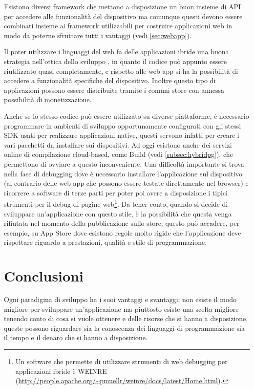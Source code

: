         Esistono diversi frame\-work che mettono a disposizione un buon insieme di
        API per accedere alle funzionalità del dispositivo ma comunque questi
        devono essere combinati insieme ai frame\-work utilizzabili
        per costruire applicazioni web in modo da poterne sfruttare tutti i
        vantaggi (vedi \ref{sec:webapp}).

        Il poter utilizzare i linguaggi del web fa delle applicazioni ibride una
        buona strategia nell'ottica dello sviluppo \crossplat{}, in quanto
        il codice può appunto essere riutilizzato quasi completamente, e
        rispetto alle web app si ha la possibilità di accedere a
        funzionalità specifiche del dispositivo. Inoltre questo tipo di
        applicazioni possono essere distribuite tramite i comuni \mbox{store} con
        annessa possibilità di monetizzazione.

        Anche se lo stesso codice può essere utilizzato su diverse piattaforme,
        è necessario programmare in ambienti di sviluppo opportunamente
        configurati con gli stessi SDK usati per realizzare applicazioni native,
        questi servono infatti per creare i vari pacchetti da installare sui
        dispositivi. Ad oggi
        esistono anche dei servizi online di compilazione cloud-based, come
        \pg{} Build (vedi \ref{subsec:hybridpg}), che permettono di ovviare a
        questo inconveniente. Una difficoltà
        importante si trova nella fase di debugging dove è necessario installare
        l'applicazione sul dispositivo (al contrario delle web app che possono
        essere testate direttamente nel \mbox{browser}) e ricorrere a software di terze
        parti per poter poi avere a disposizione i tipici strumenti per il
        debug di pagine web\footnote{Un software che permette di utilizzare
        strumenti di web debugging per applicazioni ibride è WEINRE
        (\url{http://people.apache.org/~pmuellr/weinre/docs/latest/Home.html}).
        }. Da tener conto, quando si decide di sviluppare un'applicazione con
        questo stile, è la possibilità che questa venga rifiutata nel momento
        della pubblicazione sullo \mbox{store}; questo può accadere, per esempio, su
        App Store dove esistono regole molto rigide che l'applicazione deve
        rispettare riguardo a prestazioni, qualità e stile di programmazione.

    \section{Conclusioni}
        Ogni paradigma di sviluppo ha i suoi vantaggi e svantaggi; non esiste il
        modo migliore per sviluppare un'applicazione ma piuttosto esiste una
        scelta migliore tenendo conto di cosa si vuole ottenere e delle risorse
        che si hanno a disposizione, queste possono riguardare sia la
        conoscenza dei linguaggi di programmazione sia il tempo e il denaro che
        si hanno a disposizione.

